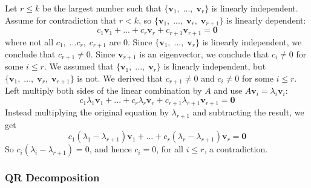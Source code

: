 
{Let \(r \leq k\) be the largest number such that \(\{\mathbf{v}_1,\;...,\;\mathbf{v}_r\}\) is linearly independent. Assume for contradiction that \(r < k\), so \(\{\mathbf{v}_1,\;...,\;\mathbf{v}_r,\;\mathbf{v}_{r+1}\}\) is linearly dependent:
\begin{equation}
    c_1\mathbf{v}_1 + ... + c_r\mathbf{v}_r + c_{r+1}\mathbf{v}_{r+1} = \mathbf{0}
\end{equation} 
where not all \(c_1,\;...c_r,\;c_{r+1}\) are 0. Since \(\{\mathbf{v}_1,\;...,\;\mathbf{v}_{r}\}\) is linearly independent, we conclude that \(c_{r+1} \neq 0\). Since \(\mathbf{v}_{r+1}\) is an eigenvector, we conclude that \(c_i \neq 0\) for some \(i \leq r\). We assumed that \(\{\mathbf{v}_1,\;...,\;\mathbf{v}_r\}\) is linearly independent, but \(\{\mathbf{v}_1,\;...,\;\mathbf{v}_r,\;\mathbf{v}_{r+1}\}\) is not. We derived that \(c_{r+1} \neq 0\) and \(c_i \neq 0\) for some \(i \leq r\). Left multiply both sides of the linear combination by \(A\) and use \(A\mathbf{v}_i = \lambda_i\mathbf{v}_i\):
\begin{equation}
    c_1\lambda_1\mathbf{v}_1 + ... + c_r\lambda_r\mathbf{v}_r + c_{r+1}\lambda_{r+1}\mathbf{v}_{r+1} = \mathbf{0}
\end{equation}
Instead multiplying the original equation by \(\lambda_{r+1}\) and subtracting the result, we get
\begin{equation}
    c_1(\lambda_1 - \lambda_{r+1})\mathbf{v}_1 + ... + c_r(\lambda_r - \lambda_{r+1})\mathbf{v}_r = \mathbf{0}
\end{equation}
So \(c_i(\lambda_i - \lambda_{r+1}) = 0\), and hence \(c_i = 0\), for all \(i \leq r\), a contradiction.}

\subsubsection{QR Decomposition}


